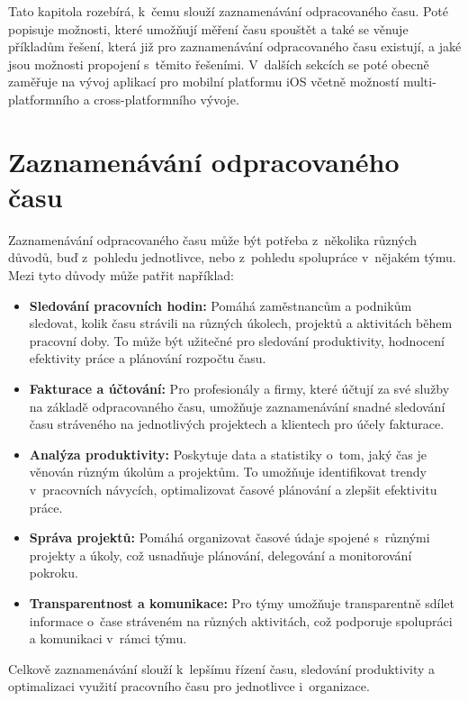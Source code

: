 Tato kapitola rozebírá, k~čemu slouží zaznamenávání odpracovaného času. Poté popisuje možnosti, které umožňují měření času spouštět a také se věnuje příkladům řešení, která již pro zaznamenávání odpracovaného času existují, a jaké jsou možnosti propojení s~těmito řešeními. V~dalších sekcích se poté obecně zaměřuje na vývoj aplikací pro mobilní platformu iOS včetně možností multi-platformního a cross-platformního vývoje.

\section{Zaznamenávání odpracovaného času}

Zaznamenávání odpracovaného času může být potřeba z~několika různých důvodů, buď z~pohledu jednotlivce, nebo z~pohledu spolupráce v~nějakém týmu. Mezi tyto důvody může patřit například:
\begin{itemize}
\item\textbf{Sledování pracovních hodin:} Pomáhá zaměstnancům a podnikům sledovat, kolik času strávili na různých úkolech, projektů a aktivitách během pracovní doby. To může být užitečné pro sledování produktivity, hodnocení efektivity práce a plánování rozpočtu času.
\item\textbf{Fakturace a účtování:} Pro profesionály a firmy, které účtují za své služby na základě odpracovaného času, umožňuje zaznamenávání snadné sledování času stráveného na jednotlivých projektech a klientech pro účely fakturace.
\item\textbf{Analýza produktivity:} Poskytuje data a statistiky o~tom, jaký čas je věnován různým úkolům a projektům. To umožňuje identifikovat trendy v~pracovních návycích, optimalizovat časové plánování a zlepšit efektivitu práce.
\item\textbf{Správa projektů:} Pomáhá organizovat časové údaje spojené s~různými projekty a úkoly, což usnadňuje plánování, delegování a monitorování pokroku.
\item\textbf{Transparentnost a komunikace:} Pro týmy umožňuje transparentně sdílet informace o~čase stráveném na různých aktivitách, což podporuje spolupráci a komunikaci v~rámci týmu.
\end{itemize}

Celkově zaznamenávání slouží k~lepšímu řízení času, sledování produktivity a optimalizaci využití pracovního času pro jednotlivce i~organizace.

